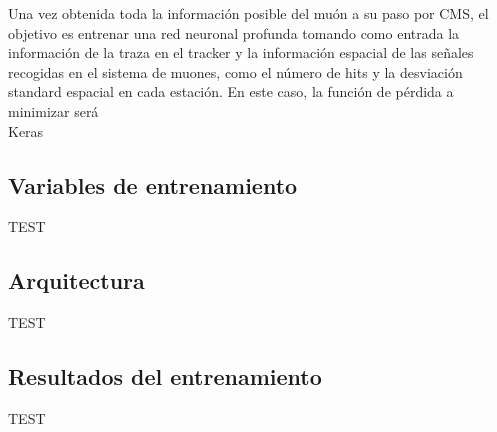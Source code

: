 
Una vez obtenida toda la informaci\'on posible del mu\'on a su paso por CMS, el objetivo es entrenar una red neuronal profunda tomando como entrada la informaci\'on de la traza en el tracker y la informaci\'on espacial de las señales recogidas en el sistema de muones, como el n\'umero de hits y la desviaci\'on standard espacial en cada estaci\'on. En este caso, la funci\'on de p\'erdida a minimizar ser\'a  \\

Keras



\subsection{Variables de entrenamiento}\label{variables}

TEST

\subsection{Arquitectura}\label{arch}

TEST

\subsection{Resultados del entrenamiento}\label{trainresults}

TEST

